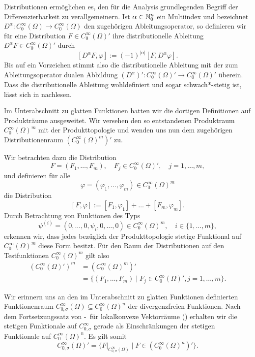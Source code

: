 Distributionen ermöglichen es, den für die Analysis grundlegenden Begriff der Differenzierbarkeit zu verallgemeinern.
Ist $\alpha \in \mathbb{N}_0^n$ ein Multiindex und bezeichnet $D^\alpha \colon C_0^\infty(\Omega) \to C_0^\infty(\Omega)$ den zugehörigen Ableitungsoperator, so definieren wir für eine Distribution $F \in C_0^\infty(\Omega)'$ ihre distributionelle Ableitung $D^\alpha F \in C_0^\infty(\Omega)'$ durch
$$
  [D^\alpha F, \varphi] := (-1)^{|\alpha|} [F, D^\alpha \varphi].
$$
Bis auf ein Vorzeichen stimmt also die distributionelle Ableitung mit der zum Ableitungsoperator dualen Abbildung $(D^\alpha)' \colon C_0^\infty(\Omega)' \to C_0^\infty(\Omega)'$ überein.
Dass die distributionelle Ableitung wohldefiniert und sogar schwach*-stetig ist, lässt sich in \cite[S.434, Lemma VIII.5.7]{werner2011fa} nachlesen.

Im Unterabschnitt zu glatten Funktionen hatten wir die dortigen Definitionen auf Produkträume ausgeweitet.
Wir versehen den so entstandenen Produktraum $C_0^\infty(\Omega)^m$ mit der Produkttopologie und wenden uns nun dem zugehörigen Distributionenraum $(C_0^\infty(\Omega)^m)'$ zu.

Wir betrachten dazu die Distribution
$$
  F = (F_1, \dots, F_m), \quad F_j \in C_0^\infty(\Omega)', \quad j = 1, \dots, m,
$$
und definieren für alle 
$$\varphi = (\varphi_1, \dots, \varphi_m) \in C_0^\infty(\Omega)^m$$
die Distribution
\begin{equation}
  \label{eq:pairingVector}
  [F, \varphi] := [F_1, \varphi_1] + \dots + [F_m, \varphi_m].
\end{equation}
Durch Betrachtung von Funktionen des Typs 
$$\psi^{(i)} = (0, \dots,0, \psi_i, 0,\dots,0) \in C_0^\infty(\Omega)^m, \quad i \in \{1,\dots,m\}, $$
erkennen wir, dass jedes bezüglich der Produkttopologie stetige Funktional auf $C_0^\infty(\Omega)^m$ diese Form besitzt.
Für den Raum der Distributionen auf den Testfunktionen $C_0^\infty(\Omega)^m$ gilt also
\begin{align*}
  (C_0^\infty(\Omega)')^m 
  &= (C_0^\infty(\Omega)^m)' \\
  &= \{(F_1,\dots,F_m) \mid F_j \in C_0^\infty(\Omega)', j = 1, \dots,m\}.
\end{align*}

Wir erinnern uns an den im Unterabschnitt zu glatten Funktionen definierten Funktionenraum $C_{0, \sigma}^\infty(\Omega) \subseteq C_0^\infty(\Omega)^n$ der divergenzfreien Funktionen.
Nach dem Fortsetzungssatz von \hahn\hyp{}\banach\ für lokalkonvexe Vektorräume (\cite[S.408, Satz VIII.2.8]{werner2011fa}) erhalten wir die stetigen Funktionale auf $C_{0,\sigma}^\infty$ gerade als Einschränkungen der stetigen Funktionale auf $C_0^\infty(\Omega)^n$. 
Es gilt somit
$$
C_{0,\sigma}^\infty(\Omega)' = \{F|_{C_{0,\sigma}^\infty(\Omega)} \mid F \in (C_0^\infty(\Omega)^n)'\}.
$$

